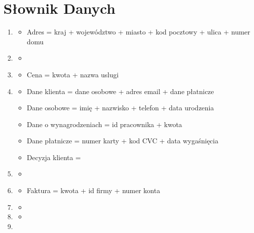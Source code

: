 \documentclass[a4paper,11pt]{article}
\begin{document}
\section{Słownik Danych}
\begin{enumerate}[label= \textbf{\Alph*}]
\item \begin{itemize} %
    \item[]
    Adres = kraj + województwo + miasto + kod pocztowy + ulica + numer domu
\end{itemize}
\item \begin{itemize} %
    \item[]
\end{itemize}
\item \begin{itemize} %
    \item[]
    Cena = kwota + nazwa uslugi
\end{itemize}
\item \begin{itemize} %
    \item[]
    Dane klienta = dane osobowe + adres email + dane płatnicze
    \item[]
    Dane osobowe = imię + nazwisko + telefon + data urodzenia
    \item[]
    Dane o wynagrodzeniach = id pracownika + kwota
    \item[]
    Dane płatnicze = numer karty + kod CVC + data wygaśnięcia
    \item[]
    Decyzja klienta = 
\end{itemize}
\item \begin{itemize} %
    \item[]
\end{itemize}
\item \begin{itemize} %
    \item[]
    Faktura = kwota + id firmy + numer konta
\end{itemize}
\item \begin{itemize} %
    \item[]
\end{itemize}
\item \begin{itemize} %
    \item[]
\end{itemize}
\item \begin{itemize} %

\end{itemize}
\end{enumerate}
\end{document}
